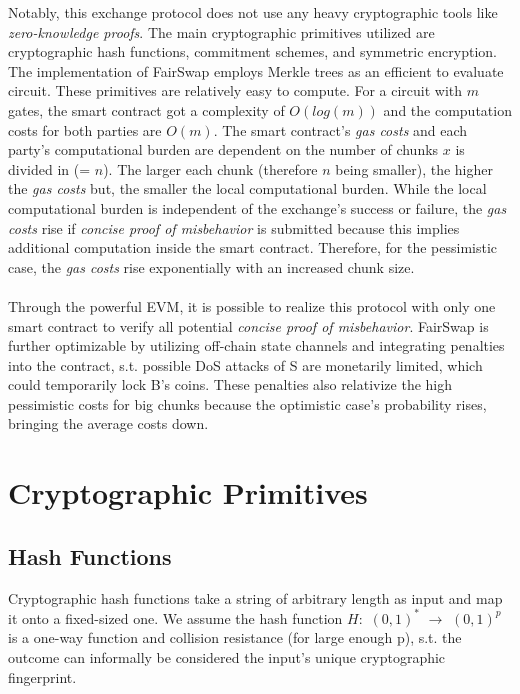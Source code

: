 \documentclass{cacthesis}
\newcounter{protocol}
\begin{document}
        Notably, this exchange protocol does not use any heavy cryptographic tools like \textit{zero-knowledge proofs}. The main cryptographic primitives utilized are cryptographic hash functions, commitment schemes, and symmetric encryption. The implementation of FairSwap employs Merkle trees as an efficient to evaluate circuit. These primitives are relatively easy to compute. For a circuit with $m$ gates, the smart contract got a complexity of $O(log(m))$ and the computation costs for both parties are $O(m)$. The smart contract's \textit{gas costs} and each party's computational burden are dependent on the number of chunks $x$ is divided in (= $n$). The larger each chunk (therefore $n$ being smaller), the higher the \textit{gas costs} but, the smaller the local computational burden. While the local computational burden is independent of the exchange's success or failure, the \textit{gas costs} rise if \textit{concise proof of misbehavior} is submitted because this implies additional computation inside the smart contract. Therefore, for the pessimistic case, the \textit{gas costs} rise exponentially with an increased chunk size. \\\\
        Through the powerful EVM, it is possible to realize this protocol with only one smart contract to verify all potential \textit{concise proof of misbehavior}.
        FairSwap is further optimizable by utilizing off-chain state channels and integrating penalties into the contract, s.t. possible DoS attacks of S are monetarily limited, which could temporarily lock B's coins. These penalties also relativize the high pessimistic costs for big chunks because the optimistic case's probability rises, bringing the average costs down.
                
        \section{Cryptographic Primitives}
        \label{sec:CryptoPrimitives}
	        \subsection{Hash Functions}
	        \label{sub:HashFunctions}
	        Cryptographic hash functions take a string of arbitrary length as input and map it onto a fixed-sized one. We assume the hash function $H:$ $ (0, 1)^*$ $\rightarrow$ $(0, 1)^p$  is a one-way function and collision resistance (for large enough p), s.t. the outcome can informally be considered the input's unique cryptographic fingerprint. 
\end{document}
